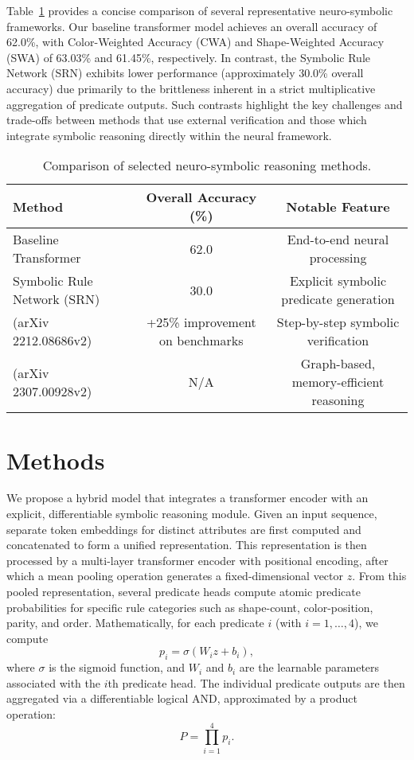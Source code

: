 \documentclass[11pt]{article}
\begin{document}
Table~\ref{tab:comp_results} provides a concise comparison of several representative neuro-symbolic frameworks. Our baseline transformer model achieves an overall accuracy of 62.0\%, with Color-Weighted Accuracy (CWA) and Shape-Weighted Accuracy (SWA) of 63.03\% and 61.45\%, respectively. In contrast, the Symbolic Rule Network (SRN) exhibits lower performance (approximately 30.0\% overall accuracy) due primarily to the brittleness inherent in a strict multiplicative aggregation of predicate outputs. Such contrasts highlight the key challenges and trade-offs between methods that use external verification and those which integrate symbolic reasoning directly within the neural framework.

\begin{table}[h]
\centering
\begin{tabular}{lcc}
\hline
\textbf{Method} & \textbf{Overall Accuracy (\%)} & \textbf{Notable Feature} \\
\hline
Baseline Transformer & 62.0 & End-to-end neural processing \\
Symbolic Rule Network (SRN) & 30.0 & Explicit symbolic predicate generation \\
(arXiv 2212.08686v2) & +25\% improvement on benchmarks & Step-by-step symbolic verification \\
(arXiv 2307.00928v2) & N/A & Graph-based, memory-efficient reasoning \\
\hline
\end{tabular}
\caption{Comparison of selected neuro-symbolic reasoning methods.}
\label{tab:comp_results}
\end{table}

\section{Methods}
We propose a hybrid model that integrates a transformer encoder with an explicit, differentiable symbolic reasoning module. Given an input sequence, separate token embeddings for distinct attributes are first computed and concatenated to form a unified representation. This representation is then processed by a multi-layer transformer encoder with positional encoding, after which a mean pooling operation generates a fixed-dimensional vector \( z \). From this pooled representation, several predicate heads compute atomic predicate probabilities for specific rule categories such as shape-count, color-position, parity, and order. Mathematically, for each predicate \(i\) (with \(i=1,\dots,4\)), we compute
\[
p_i = \sigma\left(W_i z + b_i\right),
\]
where \(\sigma\) is the sigmoid function, and \(W_i\) and \(b_i\) are the learnable parameters associated with the \(i\)th predicate head. The individual predicate outputs are then aggregated via a differentiable logical AND, approximated by a product operation:
\[
P = \prod_{i=1}^{4} p_i.
\]
\end{document}
